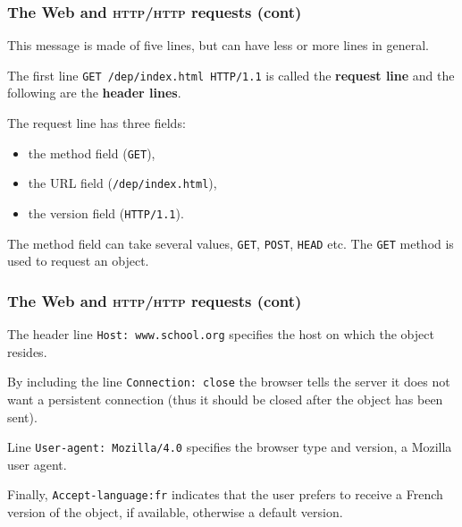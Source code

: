 %
\begin{frame}[containsverbatim]
\frametitle{The Web and \textsc{http}/\textsc{http} requests (cont)}

This message is made of five lines, but can have less or more lines in
general.

\bigskip

The first line \verb+GET /dep/index.html HTTP/1.1+ is called the
\textbf{request line} and the following are the \textbf{header
  lines}.

\bigskip

The request line has three fields:
\begin{itemize}

  \item the method field (\verb+GET+),

  \item the URL field (\verb+/dep/index.html+),

  \item the version field (\verb+HTTP/1.1+).

\end{itemize}
The method field can take several values, \verb+GET+, \verb+POST+,
\verb+HEAD+ etc. The \verb+GET+ method is used to request an object.

\end{frame}

%
\begin{frame}[containsverbatim]
\frametitle{The Web and \textsc{http}/\textsc{http} requests (cont)}

The header line \verb+Host: www.school.org+ specifies the host on
which the object resides.

\bigskip

By including the line \verb+Connection: close+ the browser tells the
server it does not want a persistent connection (thus it should be
closed after the object has been sent).

\bigskip

Line \verb+User-agent: Mozilla/4.0+ specifies the browser type and
version, a Mozilla user agent.

\bigskip

Finally, \verb+Accept-language:fr+ indicates that the user prefers to
receive a French version of the object, if available, otherwise a
default version.

\end{frame}

